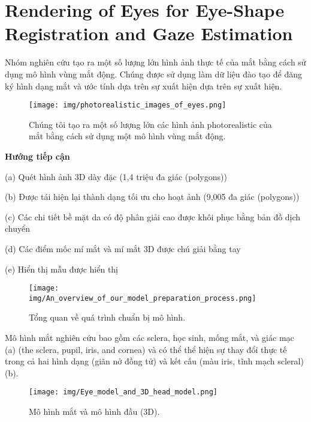 \section{Rendering of Eyes for Eye-Shape Registration and Gaze Estimation
\cite{eyeShapeRegistrationAndGazeEstimation}}
Nhóm nghiên cứu tạo ra một số lượng lớn hình ảnh thực tế của mắt bằng cách sử dụng mô hình vùng mắt động. Chúng được sử dụng làm dữ liệu đào tạo để đăng ký hình dạng mắt và ước tính dựa trên sự xuất hiện dựa trên sự xuất hiện.
\begin{center}
    \begin{figure}[h!]
    \begin{center}
     \texttt{[image: img/photorealistic\_images\_of\_eyes.png]}
    \end{center}
    \caption{Chúng tôi tạo ra một số lượng lớn các hình ảnh photorealistic của mắt bằng cách sử dụng một mô hình vùng mắt động.}
    \label{refhinh20}
    \end{figure}
\end{center}
\textbf{Hướng tiếp cận}

(a) Quét hình ảnh 3D dày đặc (1,4 triệu đa giác (polygons))

(b) Được tái hiện lại thành dạng tối ưu cho hoạt ảnh (9,005 đa giác (polygons))

(c) Các chi tiết bề mặt da có độ phân giải cao được khôi phục bằng bản đồ dịch chuyển 

(d) Các điểm mốc mí mắt và mí mắt 3D được chú giải bằng tay 

(e) Hiển thị mẫu được hiển thị 
\begin{center}
    \begin{figure}[h!]
    \begin{center}
     \texttt{[image: img/An\_overview\_of\_our\_model\_preparation\_process.png]}
    \end{center}
    \caption{Tổng quan về quá trình chuẩn bị mô hình.}
    \label{refhinh20}
    \end{figure}
\end{center}
Mô hình mắt nghiên cứu bao gồm các sclera, học sinh, mống mắt, và giác mạc (a) (the sclera, pupil, iris, and cornea) và có thể thể hiện sự thay đổi thực tế trong cả hai hình dạng (giãn nở đồng tử) và kết cấu (màu iris, tĩnh mạch scleral) (b).
\begin{center}
    \begin{figure}[h!]
    \begin{center}
     \texttt{[image: img/Eye\_model\_and\_3D\_head\_model.png]}
    \end{center}
    \caption{Mô hình mắt và mô hình đầu (3D).}
    \label{refhinh20}
    \end{figure}
\end{center}

